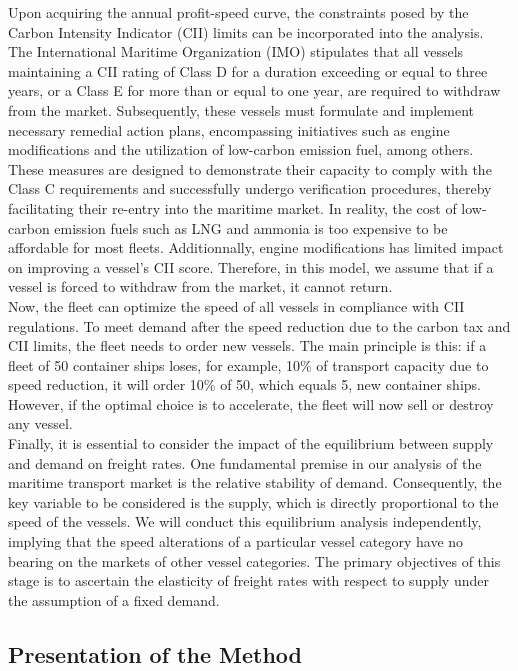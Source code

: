 \documentclass[a4paper,12pt]{article}
\begin{document}
Upon acquiring the annual profit-speed curve, the constraints posed by the Carbon Intensity Indicator (CII) limits can be incorporated into the analysis.
The International Maritime Organization (IMO) stipulates that all vessels maintaining a CII rating of Class D for a duration exceeding or equal to three years, or a Class E for more than or equal to one year, are required to withdraw from the market.
Subsequently, these vessels must formulate and implement necessary remedial action plans, encompassing initiatives such as engine modifications and the utilization of low-carbon emission fuel, among others.
These measures are designed to demonstrate their capacity to comply with the Class C requirements and successfully undergo verification procedures, thereby facilitating their re-entry into the maritime market.
In reality, the cost of low-carbon emission fuels such as LNG and ammonia is too expensive to be affordable for most fleets.
Additionnally, engine modifications has limited impact on improving a vessel's CII score.
Therefore, in this model, we assume that if a vessel is forced to withdraw from the market, it cannot return.\\

Now, the fleet can optimize the speed of all vessels in compliance with CII regulations.
To meet demand after the speed reduction due to the carbon tax and CII limits, the fleet needs to order new vessels.
The main principle is this: if a fleet of 50 container ships loses, for example, 10\% of transport capacity due to speed reduction, it will order 10\% of 50, which equals 5, new container ships.
However, if the optimal choice is to accelerate, the fleet will now sell or destroy any vessel.\\

Finally, it is essential to consider the impact of the equilibrium between supply and demand on freight rates.
One fundamental premise in our analysis of the maritime transport market is the relative stability of demand.
Consequently, the key variable to be considered is the supply, which is directly proportional to the speed of the vessels. We will conduct this equilibrium analysis independently, implying that the speed alterations of a particular vessel category have no bearing on the markets of other vessel categories.
The primary objectives of this stage is to ascertain the elasticity of freight rates with respect to supply under the assumption of a fixed demand.\\


\subsection{Presentation of the Method}
\end{document}
